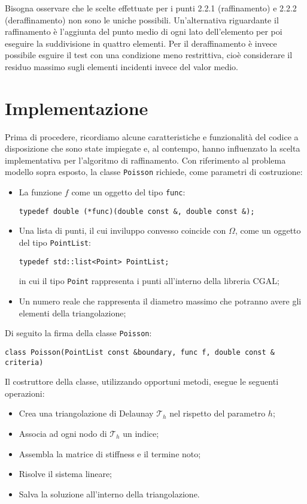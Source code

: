 \documentclass[a4paper,10pt,twoside]{amsart}
\theoremstyle{remark}
\theoremstyle{definition}
\renewcommand{\tt}{\texttt}
\begin{document}
Bisogna osservare che le scelte effettuate per i punti 2.2.1 (raffinamento) e 2.2.2 (deraffinamento) non sono le uniche possibili. Un'alternativa riguardante il raffinamento è l'aggiunta del punto medio di ogni lato dell'elemento per poi eseguire la suddivisione in quattro elementi. Per il deraffinamento è invece possibile esguire il test con una condizione meno restrittiva, cioè considerare il residuo massimo sugli elementi incidenti invece del valor medio.

\section{Implementazione}
Prima di procedere, ricordiamo alcune caratteristiche e funzionalità del codice a disposizione che sono state impiegate e, al contempo, hanno influenzato la scelta implementativa per l'algoritmo di raffinamento. Con riferimento al problema modello sopra esposto, la classe \tt{Poisson} \cite{FePe} richiede, come parametri di costruzione:
\begin{itemize}
\item La funzione $f$ come un oggetto del tipo \tt{func}:
\begin{lstlisting}
typedef double (*func)(double const &, double const &);
\end{lstlisting}
\item Una lista di punti, il cui inviluppo convesso coincide con $\Omega$, come un oggetto del tipo \tt{PointList}:
\begin{lstlisting}
typedef std::list<Point> PointList;
\end{lstlisting}
in cui il tipo \tt{Point} rappresenta i punti all'interno della libreria CGAL;
\item Un numero reale che rappresenta il diametro massimo che potranno avere gli elementi della triangolazione;
\end{itemize}
Di seguito la firma della classe \tt{Poisson}:
\begin{lstlisting}
class Poisson(PointList const &boundary, func f, double const & criteria)
\end{lstlisting}
Il costruttore della classe, utilizzando opportuni metodi, esegue le seguenti operazioni:
\begin{itemize}
\item Crea una triangolazione di Delaunay $\mathcal{T}_h$ nel rispetto del parametro $h$;
\item Associa ad ogni nodo di $\mathcal{T}_h$ un indice;
\item Assembla la matrice di stiffness e il termine noto;
\item Risolve il sistema lineare;
\item Salva la soluzione all'interno della triangolazione.
\end{itemize} 
\end{document}
